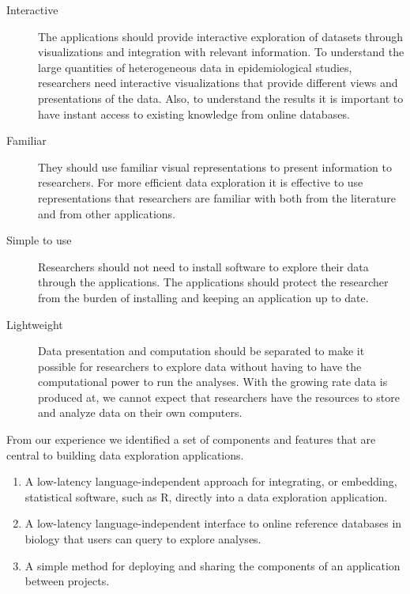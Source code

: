 \begin{description} 
\item[Interactive] The applications should provide interactive exploration
    of datasets through visualizations and integration with relevant
    information. 
    To understand the large quantities of heterogeneous data in
    epidemiological studies, researchers need interactive visualizations
    that provide different views and presentations of the data. Also, to
    understand the results it is important to have instant access to
    existing knowledge from online databases. 
    
\item[Familiar] They should use familiar visual representations to present
    information to researchers. For more efficient data exploration it is 
    effective to use representations that researchers are familiar with both from
    the literature and from other applications. 
    
\item[Simple to use] Researchers should not need to install software to
    explore their data through the applications. The applications should 
    protect the researcher from the burden of installing and keeping an
    application up to date. 
    
\item[Lightweight] Data presentation and computation should be separated
    to make it possible for researchers to explore data without having to
    have the computational power to run the analyses. With the growing rate
    data is produced at, we cannot expect that researchers have the resources to
    store and analyze data on their own computers. 
    
\end{description}


From our experience we identified a set of components and features that are
central to building data exploration applications.

\begin{enumerate}
    \item A low-latency language-independent approach for integrating, or
        embedding, statistical software, such as R, directly into a data
        exploration application. 
    \item A low-latency language-independent interface to online reference
        databases in biology that users can query to explore analyses. 
    \item A simple method for deploying and sharing the components of an
        application between projects. 
\end{enumerate} 

